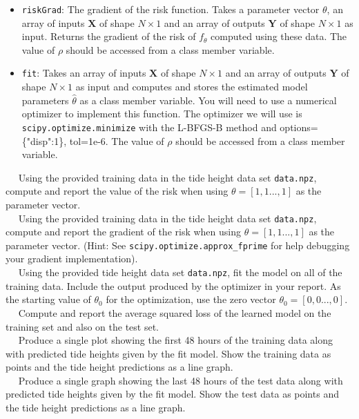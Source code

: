 \documentclass[11pt]{article}
\newcommand{\mbf}[1]{{\mathbf{#1}}}
\begin{document}
\begin{problem}{50}
\begin{itemize}
        \item \verb|riskGrad|: The gradient of the risk function. Takes a parameter vector $\theta$, an array of inputs $\mbf{X}$ of shape $N\times 1$ and an array of outputs $\mbf{Y}$ of shape $N\times 1$ as input. Returns the gradient of the risk of $f_{\theta}$ computed using these data. The value of $\rho$ should be accessed from a class member variable.      
        
        \item \verb|fit|: Takes an array of inputs $\mbf{X}$ of shape $N\times 1$ and an array of outputs $\mbf{Y}$ of shape $N\times 1$ as input and computes and stores the estimated model parameters $\hat{\theta}$ as a class member variable. You will need to use a numerical optimizer to implement this function. The optimizer we will use is \verb|scipy.optimize.minimize| with the L-BFGS-B method and  options=\{"disp":1\}, tol=1e-6.  The value of $\rho$ should be accessed from a class member variable. 
        
\end{itemize}
    
    ~~ Using the provided training data in the tide height data set \verb|data.npz|, compute and report the value of the risk 
    when using $\theta=[1,1...,1]$ as the parameter vector. \\
    
    ~~ Using the provided training data in the tide height data set \verb|data.npz|, compute and report the gradient of the risk when using $\theta=[1,1...,1]$ as the parameter vector. (Hint: See \verb|scipy.optimize.approx_fprime| for help debugging your gradient implementation).\\
    
    ~~ Using the provided tide height data set \verb|data.npz|, fit the model
    on all of the training data. Include the output produced by the optimizer in your report. As the starting value of $\theta_0$ for the optimization, use the zero vector $\theta_0=[0,0...,0]$.\\ 
    
    ~~ Compute and report the average squared loss of the learned model on the training set and also on the test set.\\
    
    ~~ Produce a single plot showing the first 48 hours of the training data along with predicted tide heights given by the fit model. Show the training data as points and the tide height predictions as a line graph.\\
    
    ~~ Produce a single graph showing the last 48 hours of the test data along with predicted tide heights given by the fit model. Show the test data as points and the tide height predictions as a line graph.\\
    
        
\end{problem}


\showpoints
\end{document}
